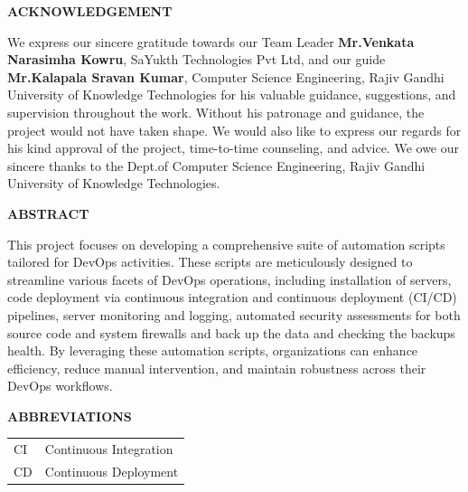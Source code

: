 \documentclass[12pt,a4paper,oneside]{report}
\begin{document}
\thispagestyle{empty}
\vspace*{3cm}
\begin{center}  {\large \bf ACKNOWLEDGEMENT}\end{center}
\vspace{1cm}
\hspace{1cm}We express our sincere gratitude towards our Team Leader \textbf{Mr.Venkata Narasimha Kowru}, SaYukth Technologies Pvt Ltd, and our guide \textbf{Mr.Kalapala Sravan Kumar},
Computer Science Engineering, Rajiv Gandhi University of Knowledge Technologies for his valuable guidance, suggestions, and supervision throughout the work. Without his patronage and guidance, the project would not have taken shape. We would also like to express our regards for his kind approval of the project, time-to-time counseling, and advice. We owe our sincere thanks to the Dept.of Computer Science Engineering, Rajiv Gandhi University of Knowledge Technologies. 
\newpage
\vspace*{2cm}
\begin{center}  {\Large \bf ABSTRACT}\end{center}
\vspace{1cm}
\noindent 
\hspace{1cm}
This project focuses on developing a comprehensive suite of automation scripts tailored for DevOps activities. These scripts are meticulously designed to streamline various facets of DevOps operations, including installation of servers, code deployment via continuous integration and continuous deployment (CI/CD) pipelines, server monitoring and logging, automated security assessments for both source code and system firewalls and back up the data and checking the backups health. By leveraging these automation scripts, organizations can enhance efficiency, reduce manual intervention, and maintain robustness across their DevOps workflows.


\newpage
\thispagestyle{empty}

\newpage
\tableofcontents 	
\cleardoublepage 

\listoffigures 	\cleardoublepage

\newpage
\begin{center}  {\Large \bf ABBREVIATIONS}\end{center}
\vspace{1cm}\doublespacing
\begin{tabular}{l l}

CI & Continuous Integration \\
CD & Continuous Deployment  \\



\end{tabular} 
\end{document}
